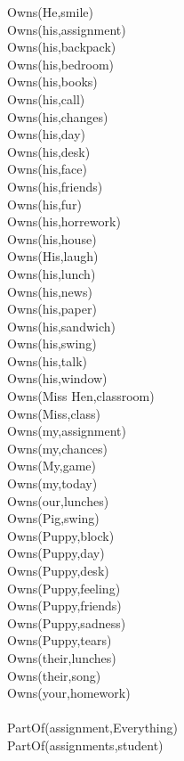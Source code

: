 \begin{multicols}{2}
\begin{footnotesize}
Owns(He,smile) \\
Owns(his,assignment) \\
Owns(his,backpack) \\
Owns(his,bedroom) \\
Owns(his,books) \\
Owns(his,call) \\
Owns(his,changes) \\
Owns(his,day) \\
Owns(his,desk) \\
Owns(his,face) \\
Owns(his,friends) \\
Owns(his,fur) \\
Owns(his,horrework) \\
Owns(his,house) \\
Owns(His,laugh) \\
Owns(his,lunch) \\
Owns(his,news) \\
Owns(his,paper) \\
Owns(his,sandwich) \\
Owns(his,swing) \\
Owns(his,talk) \\
Owns(his,window) \\
Owns(Miss Hen,classroom) \\
Owns(Miss,class) \\
Owns(my,assignment) \\
Owns(my,chances) \\
Owns(My,game) \\
Owns(my,today) \\
Owns(our,lunches) \\
Owns(Pig,swing) \\
Owns(Puppy,block) \\
Owns(Puppy,day) \\
Owns(Puppy,desk) \\
Owns(Puppy,feeling) \\
Owns(Puppy,friends) \\
Owns(Puppy,sadness) \\
Owns(Puppy,tears) \\
Owns(their,lunches) \\
Owns(their,song) \\
Owns(your,homework) \\
~\\
PartOf(assignment,Everything) \\
PartOf(assignments,student) \\

\end{footnotesize}
\end{multicols}
